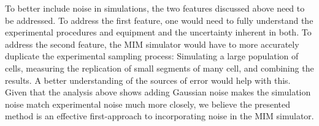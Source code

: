 		To better include noise in simulations, the two features discussed above need to be addressed.
		To address the first feature, one would need to fully understand the experimental procedures and equipment and the uncertainty inherent in both.
		To address the second feature, the MIM simulator would have to more accurately duplicate the experimental sampling process:
		Simulating a large population of cells, measuring the replication of small segments of many cell, and combining the results.
		A better understanding of the sources of error would help with this.
		Given that the analysis above shows adding Gaussian noise makes the simulation noise match experimental noise much more closely, we believe the presented method is an effective first-approach to incorporating noise in the MIM simulator.









































